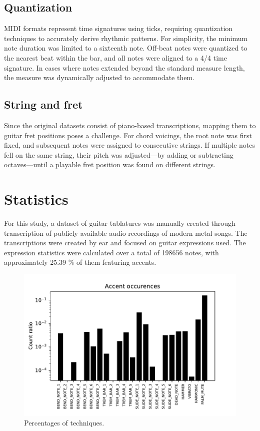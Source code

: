 \documentclass[twoside,11pt]{article}
\begin{document}
\subsection{Quantization}
MIDI formats represent time signatures using ticks, requiring 
quantization techniques to accurately derive rhythmic patterns. For simplicity, 
the minimum note duration was limited to a sixteenth note. Off-beat notes were
quantized to the nearest beat within the bar, and all notes were aligned to 
a 4/4 time signature. In cases where notes extended beyond the standard 
measure length, the measure was dynamically adjusted to accommodate them.

\subsection{String and fret}
Since the original datasets consist of piano-based transcriptions, mapping 
them to guitar fret positions poses a challenge. For chord voicings, the root
note was first fixed, and subsequent notes were assigned to consecutive 
strings. If multiple notes fell on the same string, their pitch was adjusted—by 
adding or subtracting octaves—until a playable fret position was found on 
different strings.

\section{Statistics}
For this study, a dataset of guitar tablatures was manually created through transcription of publicly available audio
recordings of modern metal songs. The transcriptions were created by ear and focused on guitar expressions used. 
The expression statistics were calculated over a total of 198656 notes, with approximately 25.39 \% 
of them featuring accents.

\begin{figure}[ht]
\centering
\includegraphics[clip, width=0.6\linewidth]{accent_probability.pdf}
\caption{Percentages of techniques.}
\label{fig:accent}
\end{figure}
\end{document}
